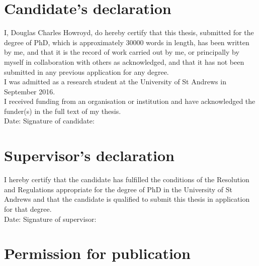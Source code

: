 

\vspace{-1.3em}
\section*{Candidate's declaration}

\noindent
I, Douglas Charles Howroyd, do hereby certify that this thesis, submitted for the
degree of PhD, which is approximately
30000
words in length, has been written by me, and that it is the record of work
carried out by me, or principally by myself in collaboration with others as
acknowledged, and that it has not been submitted in any previous application for
any degree.
\\

\noindent
I was admitted as a research student at the University of St Andrews in
September 2016.
\\

\noindent
I received funding from an organisation or institution and have acknowledged the
funder(s) in the full text of my thesis.
\\

\vspace{1.0em}
\noindent
Date:\makebox[7em]{\dotfill}
Signature of candidate:\dotfiall
\\

\vspace{-1.3em}
\section*{Supervisor's declaration}

\noindent
I hereby certify that the candidate has fulfilled the conditions of the
Resolution and Regulations appropriate for the degree of PhD in the University
of St Andrews and that the candidate is qualified to submit this thesis in
application for that degree.
\\

\vspace{1.0em}
\noindent
Date:\makebox[7em]{\dotfill}
Signature of supervisor:\dotfill
\\

\vspace{-1.3em}
\section*{Permission for publication}

